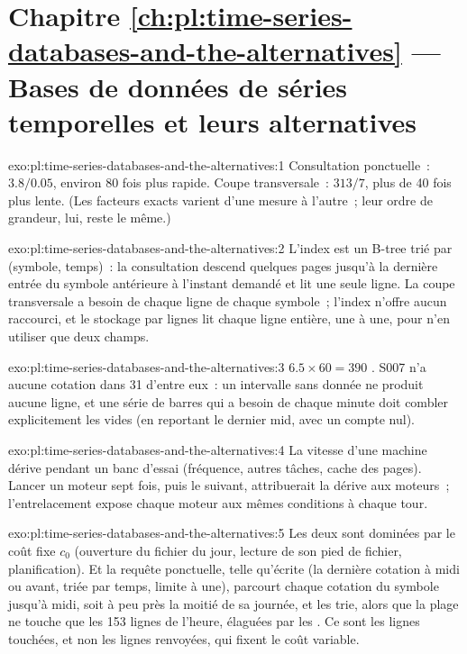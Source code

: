 \section*{Chapitre \ref{ch:pl:time-series-databases-and-the-alternatives} --- Bases de données de séries temporelles et leurs alternatives}

\begin{solution}{exo:pl:time-series-databases-and-the-alternatives:1}
Consultation ponctuelle~: $3.8 / 0.05$, environ 80 fois plus rapide. Coupe transversale~: $313 / 7$, plus de 40 fois plus lente. (Les facteurs exacts varient d'une
mesure à l'autre~; leur ordre de grandeur, lui, reste le même.)
\end{solution}

\begin{solution}{exo:pl:time-series-databases-and-the-alternatives:2}
L'index est un B-tree trié par (symbole, temps)~: la consultation descend quelques pages jusqu'à la dernière entrée du symbole
antérieure à l'instant demandé et lit une seule ligne. La coupe transversale a besoin de chaque ligne de chaque symbole~; l'index n'offre
aucun raccourci, et le stockage par lignes lit chaque ligne entière, une à une, pour n'en utiliser que deux champs.
\end{solution}

\begin{solution}{exo:pl:time-series-databases-and-the-alternatives:3}
$6.5 \times 60 = 390$ . S007 n'a aucune cotation dans 31 d'entre eux~: un intervalle sans donnée ne produit aucune ligne, et une série de barres qui
a besoin de chaque minute doit combler explicitement les vides (en reportant le dernier mid, avec un compte nul).
\end{solution}

\begin{solution}{exo:pl:time-series-databases-and-the-alternatives:4}
La vitesse d'une machine dérive pendant un banc d'essai (fréquence, autres tâches, cache des pages). Lancer un moteur sept fois, puis le suivant,
attribuerait la dérive aux moteurs~; l'entrelacement expose chaque moteur aux mêmes conditions à chaque tour.
\end{solution}

\begin{solution}{exo:pl:time-series-databases-and-the-alternatives:5}
Les deux sont dominées par le coût fixe $c_0$ (ouverture du fichier du jour, lecture de son pied de fichier, planification). Et la requête ponctuelle, telle qu'écrite
(la dernière cotation à midi ou avant, triée par temps, limite à une), parcourt chaque cotation du symbole jusqu'à midi, soit à peu près la moitié de sa journée, et les trie,
alors que la plage ne touche que les 153 lignes de l'heure, élaguées par les . Ce sont les lignes touchées, et non les lignes renvoyées, qui fixent le
coût variable.
\end{solution}

